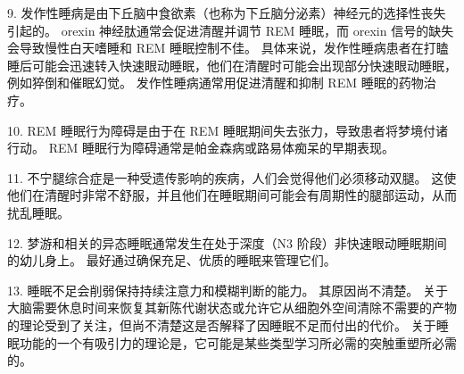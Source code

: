 9. 发作性睡病是由下丘脑中食欲素（也称为下丘脑分泌素）神经元的选择性丧失引起的。
orexin 神经肽通常会促进清醒并调节 REM 睡眠，而 orexin 信号的缺失会导致慢性白天嗜睡和 REM 睡眠控制不佳。
具体来说，发作性睡病患者在打瞌睡后可能会迅速转入快速眼动睡眠，他们在清醒时可能会出现部分快速眼动睡眠，例如猝倒和催眠幻觉。
发作性睡病通常用促进清醒和抑制 REM 睡眠的药物治疗。


10. REM 睡眠行为障碍是由于在 REM 睡眠期间失去张力，导致患者将梦境付诸行动。
REM 睡眠行为障碍通常是帕金森病或路易体痴呆的早期表现。


11. 不宁腿综合症是一种受遗传影响的疾病，人们会觉得他们必须移动双腿。
这使他们在清醒时非常不舒服，并且他们在睡眠期间可能会有周期性的腿部运动，从而扰乱睡眠。


12. 梦游和相关的异态睡眠通常发生在处于深度（N3 阶段）非快速眼动睡眠期间的幼儿身上。
最好通过确保充足、优质的睡眠来管理它们。


13. 睡眠不足会削弱保持持续注意力和模糊判断的能力。
其原因尚不清楚。
关于大脑需要休息时间来恢复其新陈代谢状态或允许它从细胞外空间清除不需要的产物的理论受到了关注，但尚不清楚这是否解释了因睡眠不足而付出的代价。
关于睡眠功能的一个有吸引力的理论是，它可能是某些类型学习所必需的突触重塑所必需的。


